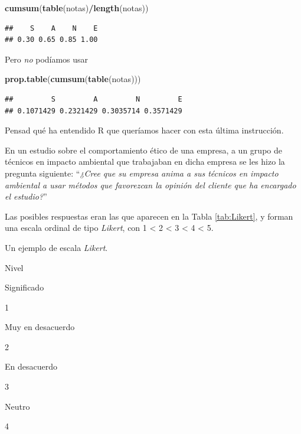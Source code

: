 \documentclass[]{book}
\newenvironment{Shaded}{\begin{snugshade}}{\end{snugshade}}
\newcommand{\KeywordTok}[1]{\textcolor[rgb]{0.13,0.29,0.53}{\textbf{#1}}}
\newcommand{\NormalTok}[1]{#1}
\newcommand{\OperatorTok}[1]{\textcolor[rgb]{0.81,0.36,0.00}{\textbf{#1}}}
\theoremstyle{definition}
\theoremstyle{definition}
\theoremstyle{definition}
\theoremstyle{remark}
\let\BeginKnitrBlock\begin \let\EndKnitrBlock\end
\begin{document}
\begin{Shaded}
\begin{Highlighting}[]
\KeywordTok{cumsum}\NormalTok{(}\KeywordTok{table}\NormalTok{(notas)}\OperatorTok{/}\KeywordTok{length}\NormalTok{(notas))}
\end{Highlighting}
\end{Shaded}

\begin{verbatim}
##    S    A    N    E 
## 0.30 0.65 0.85 1.00
\end{verbatim}

Pero \emph{no} podíamos usar

\begin{Shaded}
\begin{Highlighting}[]
\KeywordTok{prop.table}\NormalTok{(}\KeywordTok{cumsum}\NormalTok{(}\KeywordTok{table}\NormalTok{(notas)))}
\end{Highlighting}
\end{Shaded}

\begin{verbatim}
##         S         A         N         E 
## 0.1071429 0.2321429 0.3035714 0.3571429
\end{verbatim}

Pensad qué ha entendido R que queríamos hacer con esta última instrucción.

\BeginKnitrBlock{example}
\protect\hypertarget{exm:ex1704}{}{\label{exm:ex1704} }En un estudio sobre el comportamiento ético de una empresa, a un grupo de técnicos en impacto ambiental que trabajaban en dicha empresa se les hizo la pregunta siguiente: ``\emph{¿Cree que su empresa anima a sus técnicos en impacto ambiental a usar métodos que favorezcan la opinión del cliente que ha encargado el estudio?}''
\EndKnitrBlock{example}

Las posibles respuestas eran las que aparecen en la Tabla \ref{tab:Likert}, y forman una escala ordinal de tipo \emph{Likert}, con 1 \textless{} 2 \textless{} 3 \textless{} 4 \textless{} 5.

\label{tab:Likert}Un ejemplo de escala \emph{Likert}.

Nivel

Significado

1

Muy en desacuerdo

2

En desacuerdo

3

Neutro

4
\end{document}

